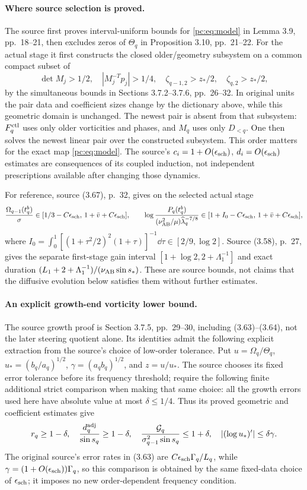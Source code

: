 \paragraph{Where source selection is proved.}
The source first proves interval-uniform bounds for \eqref{pc:eq:model} in Lemma 3.9, pp.~18--21, then excludes zeros of $\Theta_q$ in Proposition 3.10, pp.~21--22. For the actual stage it first constructs the closed older/geometry subsystem on a common compact subset of
\[
 \det M_j>1/2,\quad |M_j^{-T}p_j|>1/4,\quad
 \zeta_{q-1,2}>z_*/2,\quad \zeta_{q,2}>z_*/2,
\]
by the simultaneous bounds in Sections 3.7.2--3.7.6, pp.~26--32. In original units the pair data and coefficient sizes change by the dictionary above, while this geometric domain is unchanged. The newest pair is absent from that subsystem: $F_q^{\rm ctl}$ uses only older vorticities and phases, and $M_q$ uses only $D_{<q}$. One then solves the newest linear pair over the constructed subsystem. This order matters for the exact map \eqref{pc:eq:model}. The source's $c_i=1+O(\epsilon_{\rm sch})$, $d_i=O(\epsilon_{\rm sch})$ estimates are consequences of its coupled induction, not independent prescriptions available after changing those dynamics.

For reference, source (3.67), p.~32, gives on the selected actual stage
\[
 \frac{\Omega_{q-1}(t_q^b)}\sigma\in
 [1/3-C\epsilon_{\rm sch},\,1+\bar v+C\epsilon_{\rm sch}],\qquad
 \log\frac{P_q(t_q^b)}{(\nu_{\mathrm{AB}}^2/\mu)\widehat\lambda_q^{-7/8}}
 \in[1+I_0-C\epsilon_{\rm sch},\,1+\bar v+C\epsilon_{\rm sch}],
\]
where $I_0=\int_0^1[(1+\tau^2/2)^2(1+\tau)]^{-1}\dd\tau\in[2/9,\log2]$. Source (3.58), p.~27, gives the separate first-stage gain interval $[1+\log2,2+\Lambda_1^{-1}]$ and exact duration $(L_1+2+\Lambda_1^{-1})/(\nu_{\mathrm{AB}}\sin s_*)$. These are source bounds, not claims that the diffusive evolution below satisfies them without further estimates.

\paragraph{An explicit growth-end vorticity lower bound.}
The source growth proof is Section 3.7.5, pp.~29--30, including (3.63)--(3.64), not the later steering quotient alone. Its identities admit the following explicit extraction from the source's choice of low-order tolerance. Put $u=\Omega_q/\Theta_q$, $u_*=(b_q/a_q)^{1/2}$, $\gamma=(a_qb_q)^{1/2}$, and $z=u/u_*$. The source chooses its fixed error tolerance before its frequency threshold; require the following finite additional strict comparison when making that same choice: all the growth errors used here have absolute value at most $\delta\le1/4$. Thus its proved geometric and coefficient estimates give
\[
 r_q\ge1-\delta,\quad \frac{d_q^{\rm adj}}{\sin s_q}\ge1-\delta,\quad
 \frac{\mathcal G_q}{\sigma_{q-1}^2\sin s_q}\le1+\delta,\quad
 |(\log u_*)'|\le\delta\gamma.
\]
The original source's error rates in (3.63) are $C\epsilon_{\rm sch}\Gamma_q/L_q$, while $\gamma=(1+O(\epsilon_{\rm sch}))\Gamma_q$, so this comparison is obtained by the same fixed-data choice of $\epsilon_{\rm sch}$; it imposes no new order-dependent frequency condition.

